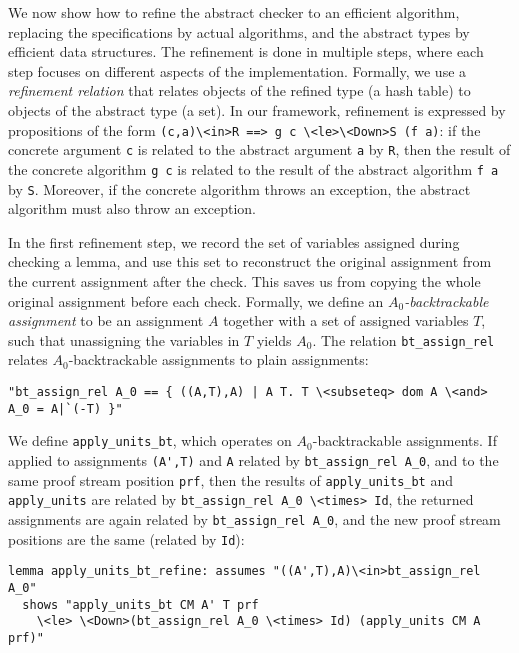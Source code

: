 \documentclass{llncs}
\newcommand{\isai}{\lstinline[language=isabelle,basicstyle=\normalsize\ttfamily\slshape]}
\begin{document}
We now show how to refine the abstract checker to an efficient algorithm, replacing the specifications by actual algorithms,
and the abstract types by efficient data structures.
The refinement is done in multiple steps, where each step focuses on different aspects of the implementation. 
Formally, we use a \emph{refinement relation} that relates objects of the refined type (\eg a hash table) to 
objects of the abstract type (\eg a set). In our framework, refinement is expressed 
by propositions of the form \isai{(c,a)\<in>R ==> g c \<le>\<Down>S (f a)}: if the concrete argument \isai$c$ is related to the abstract argument \isai$a$ by \isai$R$, then the result of the concrete
algorithm \isai$g c$ is related to the result of the abstract algorithm \isai$f a$ by \isai$S$. Moreover, if the concrete algorithm throws an exception, 
the abstract algorithm must also throw an exception.

In the first refinement step, we record the set of variables assigned during checking a lemma, 
and use this set to reconstruct the original assignment from the current assignment after the check. 
This saves us from copying the whole original assignment before each check.
Formally, we define an \emph{$A_0$-backtrackable assignment} to be an assignment $A$ together with a set of assigned variables $T$, such that
unassigning the variables in $T$ yields $A_0$. The relation \isai{bt_assign_rel} relates $A_0$-backtrackable assignments to plain assignments:
\begin{lstlisting}
"bt_assign_rel A_0 == { ((A,T),A) | A T. T \<subseteq> dom A \<and> A_0 = A|`(-T) }"
\end{lstlisting}
We define \isai{apply_units_bt}, which operates on $A_0$-backtrackable assignments. If applied 
to assignments \isai$(A',T)$ and \isai$A$ related by \isai{bt_assign_rel A_0}, and to the same proof stream position \isai$prf$, then the results of 
\isai{apply_units_bt} and \isai{apply_units} are related by \isai{bt_assign_rel A_0 \<times> Id}, \ie the returned assignments 
are again related by \isai{bt_assign_rel A_0}, and the new proof stream positions are the same (related by \isai{Id}):
\begin{lstlisting}
lemma apply_units_bt_refine: assumes "((A',T),A)\<in>bt_assign_rel A_0"
  shows "apply_units_bt CM A' T prf 
    \<le> \<Down>(bt_assign_rel A_0 \<times> Id) (apply_units CM A prf)"
\end{lstlisting}
\end{document}
